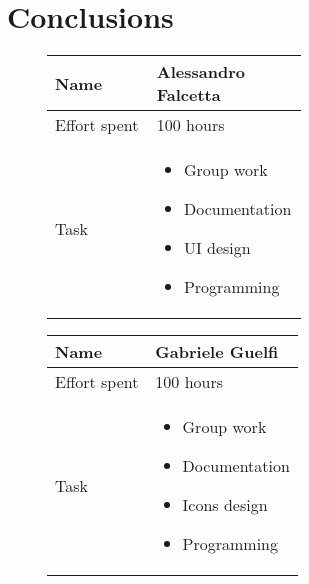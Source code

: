 \chapter{Conclusions}
\label{chap:conclusions}
\begin{figure}[H]
    \begin{tabular}{|l|p{0.6\linewidth}|}
	\hline Name & Alessandro Falcetta \\
	\hline Effort spent & 100 hours \\
	\hline Task & \begin{itemize} 
			\item Group work
			\item Documentation
			\item UI design
			\item Programming
		    \end{itemize}\\
    	\hline
    \end{tabular}
\end{figure}
\vspace{0.5cm}
\begin{figure}[H]
    \begin{tabular}{|l|p{0.6\linewidth}|}
	\hline Name & Gabriele Guelfi \\
	\hline Effort spent & 100 hours \\
	\hline Task & \begin{itemize} 
			\item Group work
			\item Documentation
			\item Icons design
			\item Programming
                     \end{itemize}\\
	\hline
	\end{tabular}
\end{figure}
